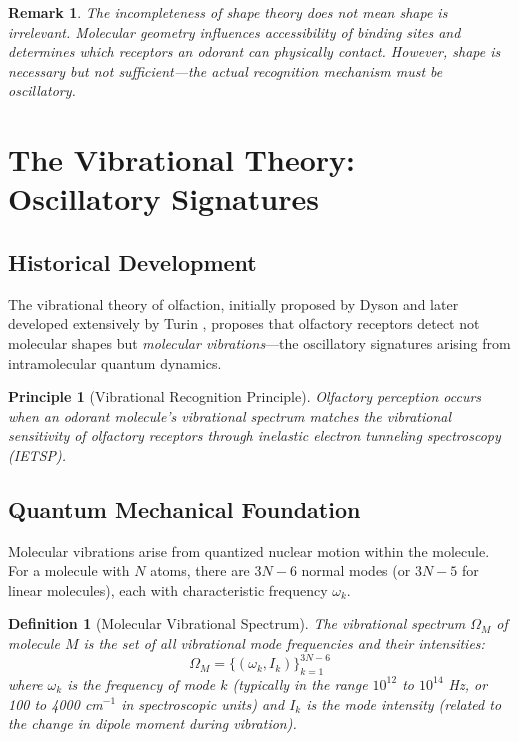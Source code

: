 \documentclass[12pt,a4paper]{article}
\newtheorem{definition}{Definition}
\newtheorem{remark}{Remark}
\newtheorem{principle}{Principle}
\begin{document}
\begin{remark}
The incompleteness of shape theory does not mean shape is irrelevant. Molecular geometry influences accessibility of binding sites and determines which receptors an odorant can physically contact. However, shape is \textit{necessary but not sufficient}—the actual recognition mechanism must be oscillatory.
\end{remark}

\section{The Vibrational Theory: Oscillatory Signatures}

\subsection{Historical Development}

The vibrational theory of olfaction, initially proposed by Dyson \cite{dyson1938scientific} and later developed extensively by Turin \cite{turin1996spectroscopic,turin2002mechanism}, proposes that olfactory receptors detect not molecular shapes but \textit{molecular vibrations}—the oscillatory signatures arising from intramolecular quantum dynamics.

\begin{principle}[Vibrational Recognition Principle]
\label{prin:vibrational_recognition}
Olfactory perception occurs when an odorant molecule's vibrational spectrum matches the vibrational sensitivity of olfactory receptors through inelastic electron tunneling spectroscopy (IETSP).
\end{principle}

\subsection{Quantum Mechanical Foundation}

Molecular vibrations arise from quantized nuclear motion within the molecule. For a molecule with $N$ atoms, there are $3N - 6$ normal modes (or $3N - 5$ for linear molecules), each with characteristic frequency $\omega_k$.

\begin{definition}[Molecular Vibrational Spectrum]
\label{def:vibrational_spectrum}
The vibrational spectrum $\Omega_M$ of molecule $M$ is the set of all vibrational mode frequencies and their intensities:
\begin{equation}
\Omega_M = \{(\omega_k, I_k)\}_{k=1}^{3N-6}
\end{equation}
where $\omega_k$ is the frequency of mode $k$ (typically in the range $10^{12}$ to $10^{14}$ Hz, or 100 to 4000 cm$^{-1}$ in spectroscopic units) and $I_k$ is the mode intensity (related to the change in dipole moment during vibration).
\end{definition}
\end{document}
